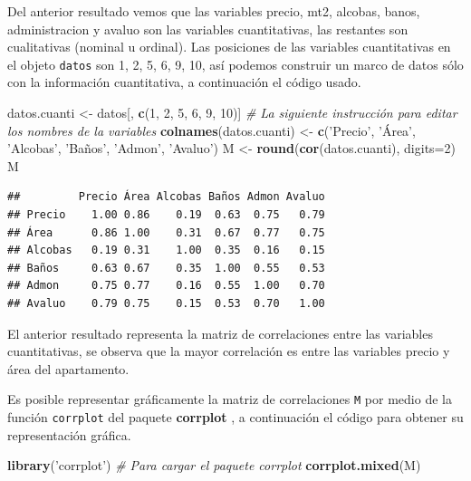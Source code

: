 \documentclass[10pt,]{krantz}
\makeatletter
\newenvironment{Shaded}{\begin{snugshade}}{\end{snugshade}}
\newcommand{\KeywordTok}[1]{\textcolor[rgb]{0.13,0.29,0.53}{\textbf{{#1}}}}
\newcommand{\DataTypeTok}[1]{\textcolor[rgb]{0.13,0.29,0.53}{{#1}}}
\newcommand{\DecValTok}[1]{\textcolor[rgb]{0.00,0.00,0.81}{{#1}}}
\newcommand{\StringTok}[1]{\textcolor[rgb]{0.31,0.60,0.02}{{#1}}}
\newcommand{\CommentTok}[1]{\textcolor[rgb]{0.56,0.35,0.01}{\textit{{#1}}}}
\newcommand{\NormalTok}[1]{{#1}}
\newenvironment{kframe}{%
\medskip{}
\setlength{\fboxsep}{.8em}
 \def\at@end@of@kframe{}%
 \ifinner\ifhmode%
  \def\at@end@of@kframe{\end{minipage}}%
  \begin{minipage}{\columnwidth}%
 \fi\fi%
 \def\FrameCommand##1{\hskip\@totalleftmargin \hskip-\fboxsep
 \colorbox{shadecolor}{##1}\hskip-\fboxsep
     \hskip-\linewidth \hskip-\@totalleftmargin \hskip\columnwidth}%
 \MakeFramed {\advance\hsize-\width
   \@totalleftmargin\z@ \linewidth\hsize
   \@setminipage}}%
 {\par\unskip\endMakeFramed%
 \at@end@of@kframe}
\renewenvironment{Shaded}{\begin{kframe}}{\end{kframe}}
\makeatother
\begin{document}
Del anterior resultado vemos que las variables precio, mt2, alcobas,
banos, administracion y avaluo son las variables cuantitativas, las
restantes son cualitativas (nominal u ordinal). Las posiciones de las
variables cuantitativas en el objeto \texttt{datos} son 1, 2, 5, 6, 9,
10, así podemos construir un marco de datos sólo con la información
cuantitativa, a continuación el código usado.

\begin{Shaded}
\begin{Highlighting}[]
\NormalTok{datos.cuanti <-}\StringTok{ }\NormalTok{datos[, }\KeywordTok{c}\NormalTok{(}\DecValTok{1}\NormalTok{, }\DecValTok{2}\NormalTok{, }\DecValTok{5}\NormalTok{, }\DecValTok{6}\NormalTok{, }\DecValTok{9}\NormalTok{, }\DecValTok{10}\NormalTok{)]}
\CommentTok{# La siguiente instrucción para editar los nombres de la variables}
\KeywordTok{colnames}\NormalTok{(datos.cuanti) <-}\StringTok{ }\KeywordTok{c}\NormalTok{(}\StringTok{'Precio'}\NormalTok{, }\StringTok{'Área'}\NormalTok{, }\StringTok{'Alcobas'}\NormalTok{,}
                            \StringTok{'Baños'}\NormalTok{, }\StringTok{'Admon'}\NormalTok{, }\StringTok{'Avaluo'}\NormalTok{)}
\NormalTok{M <-}\StringTok{ }\KeywordTok{round}\NormalTok{(}\KeywordTok{cor}\NormalTok{(datos.cuanti), }\DataTypeTok{digits=}\DecValTok{2}\NormalTok{)}
\NormalTok{M}
\end{Highlighting}
\end{Shaded}

\begin{verbatim}
##         Precio Área Alcobas Baños Admon Avaluo
## Precio    1.00 0.86    0.19  0.63  0.75   0.79
## Área      0.86 1.00    0.31  0.67  0.77   0.75
## Alcobas   0.19 0.31    1.00  0.35  0.16   0.15
## Baños     0.63 0.67    0.35  1.00  0.55   0.53
## Admon     0.75 0.77    0.16  0.55  1.00   0.70
## Avaluo    0.79 0.75    0.15  0.53  0.70   1.00
\end{verbatim}

El anterior resultado representa la matriz de correlaciones entre las
variables cuantitativas, se observa que la mayor correlación es entre
las variables precio y área del apartamento.

Es posible representar gráficamente la matriz de correlaciones
\texttt{M} por medio de la función \texttt{corrplot} del paquete
\textbf{corrplot} \citep{R-corrplot}, a continuación el
código para obtener su representación gráfica.

\begin{Shaded}
\begin{Highlighting}[]
\KeywordTok{library}\NormalTok{(}\StringTok{'corrplot'}\NormalTok{)  }\CommentTok{# Para cargar el paquete corrplot}
\KeywordTok{corrplot.mixed}\NormalTok{(M)}
\end{Highlighting}
\end{Shaded}
\end{document}
